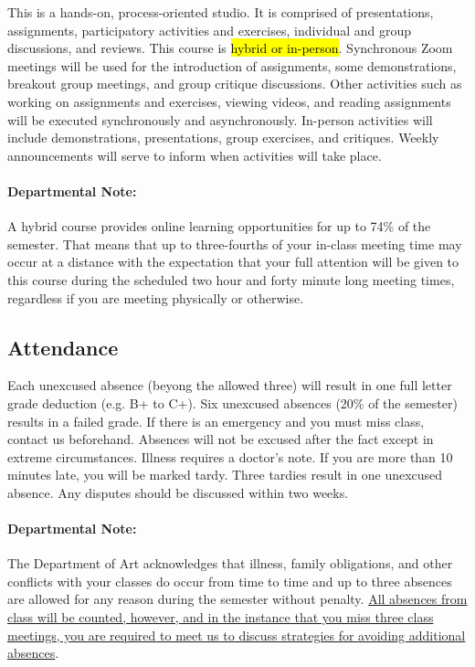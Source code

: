 \documentclass[12pt,letter,english]{report}
\begin{document}
This is a hands-on, process-oriented studio. It is comprised of presentations, assignments, participatory activities and exercises, individual and group discussions, and reviews. This course is \hl{hybrid or in-person}. Synchronous Zoom meetings will be used for the introduction of assignments, some demonstrations, breakout group meetings, and group critique discussions. Other activities such as working on assignments and exercises, viewing videos, and reading assignments will be executed synchronously and asynchronously. In-person activities will include demonstrations, presentations, group exercises, and critiques. Weekly announcements will serve to inform when activities will take place.

\paragraph{Departmental Note:} A hybrid course provides online learning opportunities for up to 74\% of the semester. That means that up to three-fourths of your in-class meeting time may occur at a distance with the expectation that your full attention will be given to this course during the scheduled two hour and forty minute long meeting times, regardless if you are meeting physically or otherwise.

\subsection{Attendance}

Each unexcused absence (beyong the allowed three) will result in one full letter grade deduction (e.g. B+ to C+). Six unexcused absences (20\% of the semester) results in a failed grade. If there is an emergency and you must miss class, contact us beforehand. Absences will not be excused after the fact except in extreme circumstances. Illness requires a doctor’s note. If you are more than 10 minutes late, you will be marked tardy. Three tardies result in one unexcused absence. Any disputes should be discussed within two weeks.

\paragraph{Departmental Note:} The Department of Art acknowledges that illness, family obligations, and other conflicts with your classes do occur from time to time and up to three absences are allowed for any reason during the semester without penalty. \ul{All absences from class will be counted, however, and in the instance that you miss three class meetings, you are required to meet us to discuss strategies for avoiding additional absences}.
\end{document}
